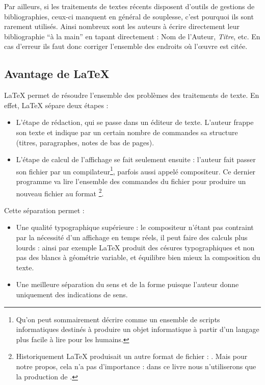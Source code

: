 Par ailleurs, si les traitements de textes récents disposent d'outils de gestions de bibliographies, ceux-ci manquent en général de souplesse, c'est pourquoi ils sont rarement utilisés. Ainsi nombreux sont les auteurs à écrire directement leur bibliographie \enquote{à la main} en tapant directement : Nom de l'Auteur, \emph{Titre}, etc. En cas d'erreur ils faut donc corriger l'ensemble des endroits où l'œuvre est citée.

\subsection{Avantage de \LaTeX{}}

\LaTeX{} permet de résoudre l'ensemble des problèmes des traitements de texte. En effet, \LaTeX{} sépare deux étapes : 

\begin{itemize}
\item L'étape de rédaction, qui se passe dans un éditeur de texte. L'auteur frappe son texte et indique par un certain nombre de commandes sa structure (titres, paragraphes, notes de bas de pages).
\item L'étape de calcul de l'affichage se fait seulement ensuite : l'auteur fait passer son fichier par un compilateur\footnote{Qu'on peut sommairement décrire comme un ensemble de scripts informatiques destinés à produire un objet informatique à partir d'un langage plus facile à lire pour les humains.}, parfois aussi appelé compositeur. Ce dernier programme va lire l'ensemble des commandes du fichier pour produire un nouveau fichier au format \footnote{Historiquement \LaTeX{} produisait un autre format de fichier : . Mais pour notre propos, cela n'a pas d'importance : dans ce livre nous n'utiliserons que la production de .}.
\end{itemize}

Cette séparation permet :
\begin{itemize}
\item Une qualité typographique supérieure :  le compositeur n'étant pas contraint par la nécessité d'un affichage en temps réels, il peut faire des calculs plus lourds : ainsi par exemple \LaTeX{} produit des césures typographiques et non pas des blancs à géométrie variable, et équilibre bien mieux la composition du texte.
\item Une meilleure séparation du sens et de la forme puisque l'auteur donne uniquement des indications de sens.
\end{itemize}

